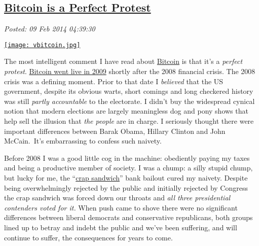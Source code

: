 %

\subsection*{\href{https://bakerjd99.wordpress.com/2014/02/08/bitcoin-is-a-perfect-protest/}{Bitcoin is a Perfect Protest}}


\noindent\emph{Posted: 09 Feb 2014 04:39:30}
\vspace{6pt}


\captionsetup[floatingfigure]{labelformat=empty}
\begin{floatingfigure}[l]{0.24\textwidth}
\centering
\href{http://bakerjd99.wordpress.com/2014/02/08/bitcoin-is-a-perfect-protest/vbitcoin/}{\texttt{[image: vbitcoin.jpg]}}
\label{fig:4521X0}
\end{floatingfigure} The
most intelligent comment I have read about
\href{https://bitcoin.org/en/}{Bitcoin} is that it's a \emph{perfect
protest}. \href{https://en.bitcoin.it/wiki/Genesis_block}{Bitcoin went
live in 2009} shortly after the 2008 financial crisis. The 2008 crisis
was a defining moment. Prior to that date I \emph{believed} that the US
government, despite its obvious warts, short comings and long checkered
history was still \emph{partly accountable} to the electorate. I didn't
buy the widespread cynical notion that modern elections are largely
meaningless dog and pony shows that help sell the illusion that
\emph{the people} are in charge. I seriously thought there were
important differences between Barak Obama, Hillary Clinton and John
McCain.~It's embarrassing to confess such naivety.

Before 2008 I was a good little cog in the machine: obediently paying my
taxes and being a productive member of society. I was a chump: a silly
stupid chump, but lucky for me, the
``\href{http://www.cbsnews.com/news/boehner-calls-bill-a-crap-sandwich-but-hell-vote-for-it/}{crap
sandwich}'' bank bailout cured my naivety. Despite being overwhelmingly
rejected by the public and initially rejected by Congress the crap
sandwich was forced down our throats and \emph{all three presidential
contenders voted for it.}  When push came to shove there were no
significant differences between liberal democrats and conservative
republicans, both groups lined up to betray and indebt the public and
we've been suffering, and will continue to suffer, the consequences for
years to come.

